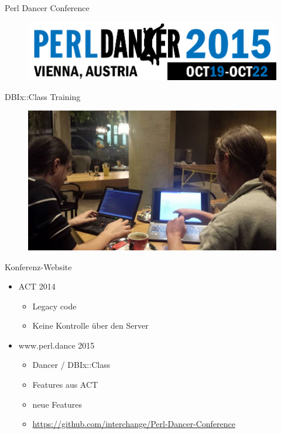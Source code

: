 \begin{frame}{Perl Dancer Conference}
\begin{figure}[!ht]
\centering
\includegraphics[width=1\linewidth]{img/perl-dancer-homepage-logo.png}
\end{figure}
\end{frame}


\begin{frame}{DBIx::Class Training}
\begin{figure}[!ht]
\centering
\includegraphics[width=1\linewidth]{img/training-preps.jpg}
\end{figure}
\end{frame}


\begin{frame}[fragile]{Konferenz-Website}
\begin{itemize}
\item ACT 2014
\begin{itemize}
\item Legacy code
\item Keine Kontrolle über den Server
\end{itemize}
\item www.perl.dance 2015
\begin{itemize}
\item Dancer / DBIx::Class
\item Features aus ACT
\item neue Features
\item \url{https://github.com/interchange/Perl-Dancer-Conference}
\end{itemize}
\end{itemize}
\end{frame}

